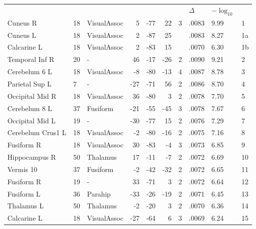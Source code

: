 \begin{table}
    \small
    \centering
    \begin{ThreePartTable}
    \begin{tabularx}{\textwidth}{l l p{1.5cm} *{3}{r} *{2}{P{.8cm}} P{1.3cm} P{.5cm}}

     \\
    \toprule
     &  &  &  &  &  &  & \(\Delta\)  & \(-\log_{10}\) &  \\
    \toprule
Cuneus R & 18 & VisualAssoc & 5 & -77 & 22 & 3 & .0083 & 9.99 & 1 \\
Cuneus L & 18 & VisualAssoc & 2 & -87 & 25 &  &  .0083 & 8.27 & 1a \\
Calcarine L & 18 & VisualAssoc & 2 & -83 & 15 &  &  .0070 & 6.30 & 1b \\
Temporal Inf R & 20 & - & 46 & -17 & -26 & 2 &  .0090 & 9.21 & 2 \\
Cerebelum 6 L & 18 & VisualAssoc & -8 & -80 & -13 & 4 &  .0087 & 8.78 & 3 \\
Parietal Sup L & 7 & - & -27 & -71 & 56 & 2 &  .0086 & 8.70 & 4 \\
Occipital Mid R & 18 & VisualAssoc & 36 & -80 & 3 & 2 &  .0078 & 7.70  & 5 \\
Cerebelum 8 L & 37 & Fusiform & -21 & -55 & -45 & 3 &  .0078  & 7.67 & 6 \\
Occipital Mid L & 19 & - & -30 & -77 & 15 & 2 &  .0076 & 7.29  & 7 \\
Cerebelum Crus1 L & 18 & VisualAssoc & -2 & -80 & -16 & 2 &  .0075 & 7.16  & 8 \\
Fusiform R & 18 & VisualAssoc & 30 & -83 & -4 & 3 &  .0073  & 6.85  & 9 \\
Hippocampus R & 50 & Thalamus & 17 & -11 & -7 & 2 &  .0072 & 6.69 & 10 \\
Vermis 10 & 37 & Fusiform & -2 & -42 & -32 & 2 &  .0072 & 6.65 & 11 \\
Fusiform R & 19 & - & 33 & -71 & 3 & 2 &  .0072 & 6.64  & 12 \\
Fusiform L & 36 & Parahip & -33 & -26 & -19 & 2 &  .0071 & 6.45  & 13 \\
Thalamus L & 50 & Thalamus & -2 & -20 & 3 & 2 &  .0070  & 6.36 & 14 \\
Calcarine L & 18 & VisualAssoc & -27 & -64 & 6 & 3 &  .0069  & 6.24  & 15 \\

\end{tabularx}
\end{ThreePartTable}
\end{table}
